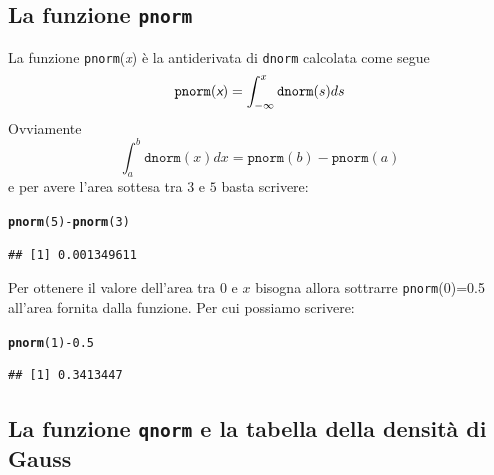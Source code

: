 \documentclass[onecolumn,12pt]{book}\usepackage[]{graphicx}\usepackage[]{color}
\makeatletter
\newcommand{\hlnum}[1]{\textcolor[rgb]{0.686,0.059,0.569}{#1}}%
\newcommand{\hlopt}[1]{\textcolor[rgb]{0,0,0}{#1}}%
\newcommand{\hlstd}[1]{\textcolor[rgb]{0.345,0.345,0.345}{#1}}%
\newcommand{\hlkwd}[1]{\textcolor[rgb]{0.737,0.353,0.396}{\textbf{#1}}}%
\newenvironment{kframe}{%
 \def\at@end@of@kframe{}%
 \ifinner\ifhmode%
  \def\at@end@of@kframe{\end{minipage}}%
  \begin{minipage}{\columnwidth}%
 \fi\fi%
 \def\FrameCommand##1{\hskip\@totalleftmargin \hskip-\fboxsep
 \colorbox{shadecolor}{##1}\hskip-\fboxsep
     \hskip-\linewidth \hskip-\@totalleftmargin \hskip\columnwidth}%
 \MakeFramed {\advance\hsize-\width
   \@totalleftmargin\z@ \linewidth\hsize
   \@setminipage}}%
 {\par\unskip\endMakeFramed%
 \at@end@of@kframe}
\newenvironment{knitrout}{}{} %
\newcommand{\varia}[1]{\textsl{\textsf{#1}}}
\makeatother
\begin{document}
\begin{knitrout}
{}



\end{knitrout}
\subsection{La funzione \texttt{pnorm}}
La funzione \texttt{pnorm}(\varia{x})   \`e la antiderivata di \texttt{dnorm} calcolata come segue
\begin{equation*}\texttt{pnorm}(\varia{x}) =\int_{-\infty}^x  \texttt{dnorm}(s)ds
\end{equation*}
Ovviamente
$$\int_a^b \texttt{dnorm}(x)dx=\texttt{pnorm}(b)-\texttt{pnorm}(a)$$
e per avere l'area sottesa tra $3$ e $5$  basta scrivere:
\begin{knitrout}
\color{fgcolor}\begin{kframe}
\begin{alltt}
\hlkwd{pnorm}\hlstd{(}\hlnum{5}\hlstd{)}\hlopt{-}\hlkwd{pnorm}\hlstd{(}\hlnum{3}\hlstd{)}
\end{alltt}
\begin{verbatim}
## [1] 0.001349611
\end{verbatim}
\end{kframe}
\end{knitrout}

Per ottenere il valore dell'area tra 0 e $x$ bisogna allora sottrarre \texttt{pnorm}(0)=0.5 all'area fornita dalla funzione.
Per cui possiamo scrivere:
\begin{knitrout}
\color{fgcolor}\begin{kframe}
\begin{alltt}
\hlkwd{pnorm}\hlstd{(}\hlnum{1}\hlstd{)}\hlopt{-}\hlnum{0.5}
\end{alltt}
\begin{verbatim}
## [1] 0.3413447
\end{verbatim}
\end{kframe}
\end{knitrout}


\subsection{La funzione \texttt{qnorm} e la tabella della densit\`a di Gauss}
\end{document}
